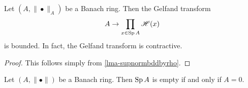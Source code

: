 \begin{proposition}\label{prop-Gelfbdd}
    Let $(A,\|\bullet\|_A)$ be a Banach ring. Then the Gelfand transform
    \[
        A\rightarrow \prod_{x\in \operatorname{Sp} A} \mathscr{H}(x)
    \]
    is bounded. In fact, the Gelfand transform is contractive.
\end{proposition}
\begin{proof}
    This follows simply from \cref{lma-supnormbddbyrho}.
\end{proof}



\begin{proposition}\label{prop-Berkospecnonempty}
    Let $(A,\|\bullet\|)$ be a Banach ring. Then $\operatorname{Sp} A$ is empty if and only if $A=0$.
\end{proposition}

